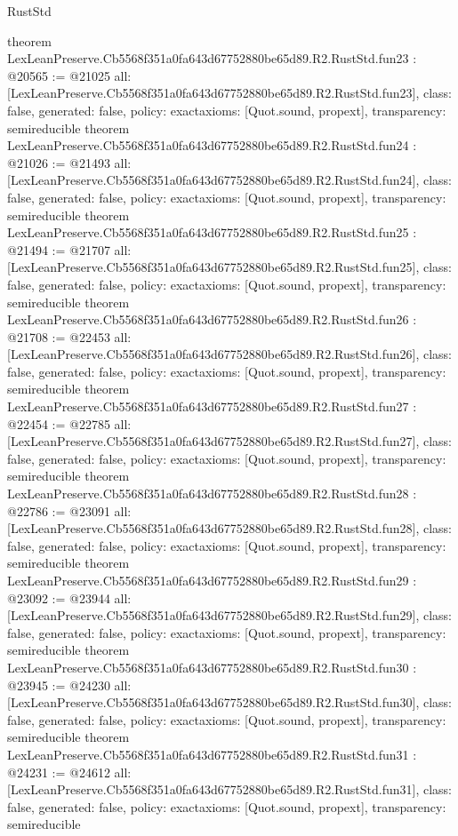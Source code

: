 \begin{lexlean}{RustStd}
\begin{coremodule}
{}
theorem LexLeanPreserve.Cb5568f351a0fa643d67752880be65d89.R2.RustStd.fun23 : @20565 := @21025 {
  all: [LexLeanPreserve.Cb5568f351a0fa643d67752880be65d89.R2.RustStd.fun23],
  class: false,
  generated: false,
  policy: exact{axioms: [Quot.sound, propext]},
  transparency: semireducible
}
theorem LexLeanPreserve.Cb5568f351a0fa643d67752880be65d89.R2.RustStd.fun24 : @21026 := @21493 {
  all: [LexLeanPreserve.Cb5568f351a0fa643d67752880be65d89.R2.RustStd.fun24],
  class: false,
  generated: false,
  policy: exact{axioms: [Quot.sound, propext]},
  transparency: semireducible
}
theorem LexLeanPreserve.Cb5568f351a0fa643d67752880be65d89.R2.RustStd.fun25 : @21494 := @21707 {
  all: [LexLeanPreserve.Cb5568f351a0fa643d67752880be65d89.R2.RustStd.fun25],
  class: false,
  generated: false,
  policy: exact{axioms: [Quot.sound, propext]},
  transparency: semireducible
}
theorem LexLeanPreserve.Cb5568f351a0fa643d67752880be65d89.R2.RustStd.fun26 : @21708 := @22453 {
  all: [LexLeanPreserve.Cb5568f351a0fa643d67752880be65d89.R2.RustStd.fun26],
  class: false,
  generated: false,
  policy: exact{axioms: [Quot.sound, propext]},
  transparency: semireducible
}
theorem LexLeanPreserve.Cb5568f351a0fa643d67752880be65d89.R2.RustStd.fun27 : @22454 := @22785 {
  all: [LexLeanPreserve.Cb5568f351a0fa643d67752880be65d89.R2.RustStd.fun27],
  class: false,
  generated: false,
  policy: exact{axioms: [Quot.sound, propext]},
  transparency: semireducible
}
theorem LexLeanPreserve.Cb5568f351a0fa643d67752880be65d89.R2.RustStd.fun28 : @22786 := @23091 {
  all: [LexLeanPreserve.Cb5568f351a0fa643d67752880be65d89.R2.RustStd.fun28],
  class: false,
  generated: false,
  policy: exact{axioms: [Quot.sound, propext]},
  transparency: semireducible
}
theorem LexLeanPreserve.Cb5568f351a0fa643d67752880be65d89.R2.RustStd.fun29 : @23092 := @23944 {
  all: [LexLeanPreserve.Cb5568f351a0fa643d67752880be65d89.R2.RustStd.fun29],
  class: false,
  generated: false,
  policy: exact{axioms: [Quot.sound, propext]},
  transparency: semireducible
}
theorem LexLeanPreserve.Cb5568f351a0fa643d67752880be65d89.R2.RustStd.fun30 : @23945 := @24230 {
  all: [LexLeanPreserve.Cb5568f351a0fa643d67752880be65d89.R2.RustStd.fun30],
  class: false,
  generated: false,
  policy: exact{axioms: [Quot.sound, propext]},
  transparency: semireducible
}
theorem LexLeanPreserve.Cb5568f351a0fa643d67752880be65d89.R2.RustStd.fun31 : @24231 := @24612 {
  all: [LexLeanPreserve.Cb5568f351a0fa643d67752880be65d89.R2.RustStd.fun31],
  class: false,
  generated: false,
  policy: exact{axioms: [Quot.sound, propext]},
  transparency: semireducible
}
\end{coremodule}
\end{lexlean}
